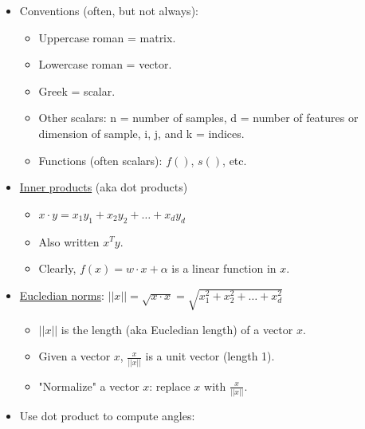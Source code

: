\documentclass[10pt]{article}
\begin{document}
\begin{description}
\begin{itemize}
			\item Conventions (often, but not always):
				\begin{itemize}
					\item Uppercase roman = matrix.
					\item Lowercase roman = vector.
					\item Greek = scalar.
					\item Other scalars: n = number of samples, d = number of features or dimension of sample, i, j, and k = indices.
					\item Functions (often scalars): $f()$, $s()$, etc.
				\end{itemize}
			\item \underline{Inner products} (aka dot products)
				\begin{itemize}
					\item $x \cdot y = x_{1}y_{1} + x_{2}y_{2} + \dots + x_{d}y_{d}$
					\item Also written $x^{T}y$.
					\item Clearly, $f(x) = w \cdot x + \alpha$ is a linear function in $x$.
				\end{itemize}
			\item \underline{Eucledian norms}: $||x|| = \sqrt{x \cdot x} = \sqrt{x_{1}^{2} + {x_{2}^{2} + \dots + x_{d}^{2}}}$
				\begin{itemize}
					\item $||x||$ is the length (aka Eucledian length) of a vector $x$.
					\item Given a vector $x$, $\frac{x}{||x||}$ is a unit vector (length 1).
					\item "Normalize" a vector $x$: replace $x$ with  $\frac{x}{||x||}$.
				\end{itemize}
			\item Use dot product to compute angles:\\
    			

\end{itemize}
\end{description}
\end{document}
